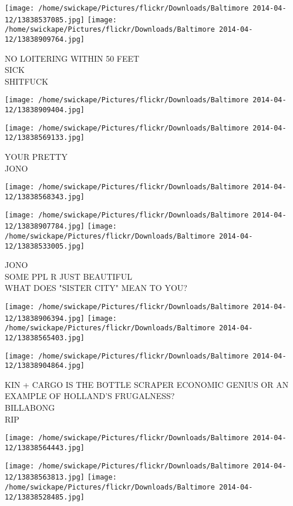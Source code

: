 \documentclass[10pt,letterpaper]{article}
\begin{document}
\vspace{0.25in}
\texttt{[image: /home/swickape/Pictures/flickr/Downloads/Baltimore 2014-04-12/13838537085.jpg]}
\texttt{[image: /home/swickape/Pictures/flickr/Downloads/Baltimore 2014-04-12/13838909764.jpg]}

NO LOITERING WITHIN 50 FEET\\
SICK\\
SHITFUCK
\pagebreak

\texttt{[image: /home/swickape/Pictures/flickr/Downloads/Baltimore 2014-04-12/13838909404.jpg]}

\vspace{0.25in}
\texttt{[image: /home/swickape/Pictures/flickr/Downloads/Baltimore 2014-04-12/13838569133.jpg]}

YOUR PRETTY\\
JONO
\pagebreak

\texttt{[image: /home/swickape/Pictures/flickr/Downloads/Baltimore 2014-04-12/13838568343.jpg]}

\vspace{0.25in}
\texttt{[image: /home/swickape/Pictures/flickr/Downloads/Baltimore 2014-04-12/13838907784.jpg]}
\texttt{[image: /home/swickape/Pictures/flickr/Downloads/Baltimore 2014-04-12/13838533005.jpg]}

JONO\\
SOME PPL R JUST BEAUTIFUL\\
WHAT DOES "SISTER CITY" MEAN TO YOU?
\pagebreak

\texttt{[image: /home/swickape/Pictures/flickr/Downloads/Baltimore 2014-04-12/13838906394.jpg]}
\texttt{[image: /home/swickape/Pictures/flickr/Downloads/Baltimore 2014-04-12/13838565403.jpg]}

\texttt{[image: /home/swickape/Pictures/flickr/Downloads/Baltimore 2014-04-12/13838904864.jpg]}

KIN + CARGO IS THE BOTTLE SCRAPER ECONOMIC GENIUS OR AN EXAMPLE OF HOLLAND'S FRUGALNESS?\\
BILLABONG\\
RIP
\pagebreak

\texttt{[image: /home/swickape/Pictures/flickr/Downloads/Baltimore 2014-04-12/13838564443.jpg]}

\vspace{0.25in}
\texttt{[image: /home/swickape/Pictures/flickr/Downloads/Baltimore 2014-04-12/13838563813.jpg]}
\texttt{[image: /home/swickape/Pictures/flickr/Downloads/Baltimore 2014-04-12/13838528485.jpg]}
\end{document}
